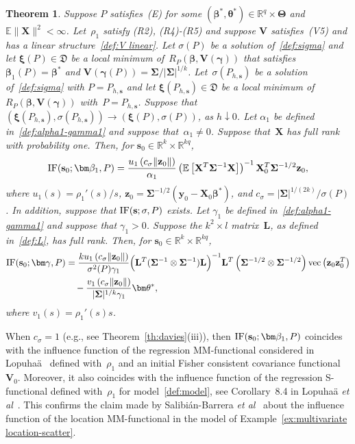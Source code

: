 \documentclass{article}
\numberwithin{equation}{section}
\theoremstyle{plain}
\newtheorem{theorem}{Theorem}
\newcommand{\R}{\mathbb{R}}
\newcommand{\vc}{\mathrm{vec}}
\newcommand{\bbeta}{\bm\beta}
\newcommand{\btheta}{\bm\theta}
\newcommand{\bxi}{\bm\xi}
\newcommand{\bgamma}{\bm\gamma}
\newcommand{\bSigma}{\mathbf{\Sigma}}
\newcommand{\bTheta}{\bm\Theta}
\newcommand{\by}{\mathbf{y}}
\newcommand{\bs}{\mathbf{s}}
\newcommand{\bz}{\mathbf{z}}
\newcommand{\bX}{\mathbf{X}}
\newcommand{\bV}{\mathbf{V}}
\newcommand{\bL}{\mathbf{L}}
\newcommand{\E}{\mathbb{E}}
\begin{document}
\begin{theorem}
\label{th:IF elliptical}
Suppose $P$ satisfies~(E) for some $(\bbeta^*,\btheta^*)\in\R^q\times\bTheta$
and~$\E\|\bX\|^2<\infty$.
Let~$\rho_1$ satisfy (R2), (R4)-(R5) 
and suppose $\bV$ satisfies~(V5) and has a linear structure~\eqref{def:V linear}.
Let $\sigma(P)$ be a solution of~\eqref{def:sigma} and let 
$\bxi(P)\in \mathfrak{D}$ be a local minimum of~$R_P(\bbeta,\bV(\bgamma))$
that satisfies $\bbeta_1(P)=\bbeta^*$ and $\bV(\bgamma(P))=\bSigma/|\bSigma|^{1/k}$.
Let~$\sigma(P_{h,\bs})$ be a solution of~\eqref{def:sigma} with $P=P_{h,\bs}$
and let $\bxi(P_{h,\bs})\in \mathfrak{D}$ be a local minimum of $R_P(\bbeta,\bV(\bgamma))$ with~$P=P_{h,\bs}$.
Suppose that $(\bxi(P_{h,\bs}),\sigma(P_{h,\bs}))\to(\bxi(P),\sigma(P))$,
as $h\downarrow0$.
Let $\alpha_1$ be defined in~\eqref{def:alpha1-gamma1} and suppose that~$\alpha_1\ne0$.
Suppose that~$\bX$ has full rank with probability one.
Then, for $\bs_0\in\R^k\times\R^{kq}$,
\[
\text{\rm IF}(\bs_0;\bbeta_1,P)
=
\frac{u_1\left(c_\sigma\|\bz_0\|\right)}{\alpha_1}
\left(
\E\left[
\bX^T\bSigma^{-1}\bX
\right]
\right)^{-1}
\bX_0^T\bSigma^{-1/2}\bz_0,
\]
where $u_1(s)=\rho_1'(s)/s$,
$\bz_0=\bSigma^{-1/2}(\by_0-\bX_0\bbeta^*)$, and  $c_\sigma=|\bSigma|^{1/(2k)}/\sigma(P)$.
In addition, 
suppose that $\text{\rm IF}(\bs;\sigma,P)$ exists.
Let $\gamma_1$ be defined in~\eqref{def:alpha1-gamma1} and suppose that $\gamma_1>0$.
Suppose the $k^2\times l$ matrix~$\bL$, as defined in~\eqref{def:L}, has full rank.
Then, for $\bs_0\in\R^k\times\R^{kq}$,
\[
\begin{split}
\text{\rm IF}(\bs_0;\bgamma,P)
&=
\frac{ku_1\left(c_\sigma\|\bz_0\|\right)}{\sigma^2(P)\gamma_1}
\Big(\bL^T(\bSigma^{-1}\otimes\bSigma^{-1})\bL\Big)^{-1}
\bL^T\left(\bSigma^{-1/2}\otimes\bSigma^{-1/2}\right)
\vc\left(\bz_0\bz_0^T\right)\\
&\quad-
\frac{v_1\left(c_\sigma\|\bz_0\|\right)}{|\bSigma|^{1/k}\gamma_1}
\btheta^*,
\end{split}
\]
where $v_1(s)=\rho_1'(s)s$.
\end{theorem}
When $c_\sigma=1$ (e.g., see Theorem~\ref{th:davies}(iii)), 
then $\text{\rm IF}(\bs_0;\bbeta_1,P)$ coincides with the influence function
of the regression MM-functional considered in Lopuha\"a~\cite{lopuhaa2023}
defined with~$\rho_1$ and an initial Fisher consistent covariance functional $\bV_0$.
Moreover, it also coincides with the influence function of the regression S-functional defined with~$\rho_1$
for model~\eqref{def:model},
see Corollary~8.4 in Lopuha\"a \emph{et al}~\cite{lopuhaa-gares-ruizgazen2023}.
This confirms the claim made by Salibi\'an-Barrera \emph{et al}~\cite{SalibianBarrera-VanAelst-Willems2006}
about the influence function of the location MM-functional in the model
of Example~\ref{ex:multivariate location-scatter}.
\end{document}
